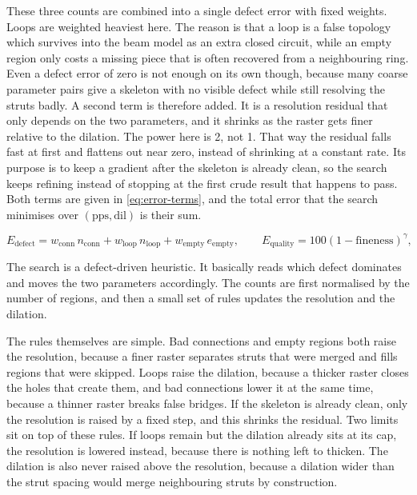 These three counts are combined into a single defect error with fixed weights. Loops are weighted heaviest here. The reason is that a loop is a false topology which survives into the beam model as an extra closed circuit, while an empty region only costs a missing piece that is often recovered from a neighbouring ring. Even a defect error of zero is not enough on its own though, because many coarse parameter pairs give a skeleton with no visible defect while still resolving the struts badly. A second term is therefore added. It is a resolution residual that only depends on the two parameters, and it shrinks as the raster gets finer relative to the dilation. The power here is 2, not 1. That way the residual falls fast at first and flattens out near zero, instead of shrinking at a constant rate. Its purpose is to keep a gradient after the skeleton is already clean, so the search keeps refining instead of stopping at the first crude result that happens to pass. Both terms are given in \cref{eq:error-terms}, and the total error that the search minimises over $(\mathrm{pps}, \mathrm{dil})$ is their sum.

\begin{equation}
  E_\mathrm{defect} = w_\mathrm{conn} \, n_\mathrm{conn} + w_\mathrm{loop} \, n_\mathrm{loop} + w_\mathrm{empty} \, e_\mathrm{empty} , \qquad
  E_\mathrm{quality} = 100 \left( 1 - \mathrm{fineness} \right)^{\gamma} ,
  \label{eq:error-terms}
\end{equation}

The search is a defect-driven heuristic. It basically reads which defect dominates and moves the two parameters accordingly. The counts are first normalised by the number of regions, and then a small set of rules updates the resolution and the dilation.

The rules themselves are simple. Bad connections and empty regions both raise the resolution, because a finer raster separates struts that were merged and fills regions that were skipped. Loops raise the dilation, because a thicker raster closes the holes that create them, and bad connections lower it at the same time, because a thinner raster breaks false bridges. If the skeleton is already clean, only the resolution is raised by a fixed step, and this shrinks the residual. Two limits sit on top of these rules. If loops remain but the dilation already sits at its cap, the resolution is lowered instead, because there is nothing left to thicken. The dilation is also never raised above the resolution, because a dilation wider than the strut spacing would merge neighbouring struts by construction.

